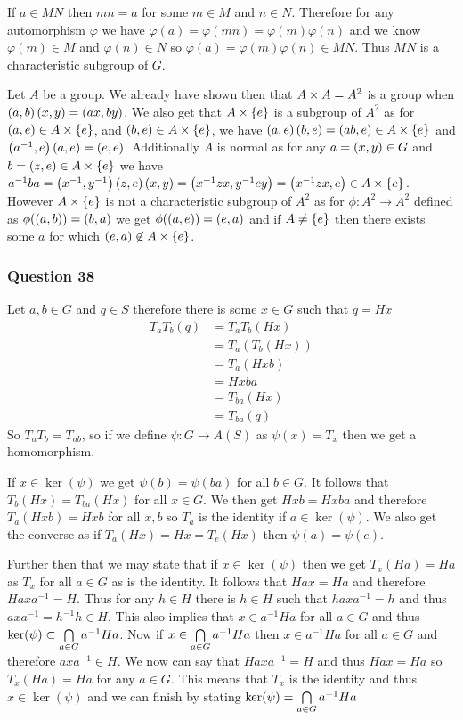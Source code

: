 \documentclass{article}
\begin{document}
 If $a \in MN$ then $mn = a$ for some $m \in M$ and $n \in N$. Therefore for any automorphism $\varphi$ we have $\varphi(a) = \varphi(mn) = \varphi(m)\varphi(n)$ and we know $\varphi(m) \in M$ and $\varphi(n)\in N$ so $\varphi(a)=\varphi(m)\varphi(n) \in MN$. Thus $MN$ is a characteristic subgroup of $G$.

 Let $A$ be a group. We already have shown then that $A\times A = A^2$ is a group when $\left( {a} , {b} \right)\left( {x} , {y} \right) = \left( {ax} , {by} \right)$. We also get that $A\times\left\{ {e} \right\}$ is a subgroup of $A^2$ as for $\left( {a} , {e} \right)\in A\times\left\{ {e} \right\}$, and $\left( {b} , {e} \right) \in A\times\left\{ {e} \right\}$, we have $\left( {a} , {e} \right)\left( {b} , {e} \right) = \left( {ab} , {e} \right)\in A\times\left\{ {e} \right\}$ and $\left( {a^{-1}} , {e} \right)\left( {a} , {e} \right) = \left( {e} , {e} \right)$. Additionally $A$ is normal as for any $a =\left( {x} , {y} \right)\in G$ and $b = \left( {z} , {e} \right)\in A\times\left\{ {e} \right\}$ we have $a^{-1}ba = \left( {x^{-1}} , {y^{-1}} \right)\left( {z} , {e} \right)\left( {x} , {y} \right) = \left( {x^{-1}zx} , {y^{-1}ey} \right) = \left( {x^{-1}zx} , {e} \right) \in A\times\left\{ {e} \right\}$. However $A\times\left\{ {e} \right\}$ is not a characteristic subgroup of $A^2$ as for $\phi:A^2\to A^2$ defined as $\phi(\left( {a} , {b} \right)) = \left( {b} , {a} \right)$ we get $\phi(\left( {a} , {e} \right)) = \left( {e} , {a} \right)$ and if $A\not=\left\{ {e} \right\}$ then there exists some $a$ for which $\left( {e} , {a} \right) \not \in A \times \left\{ {e} \right\}$.

\subsubsection{Question 38}
Let $a,b \in G $ and $q \in S$ therefore there is some $x \in G$ such that $q = Hx$
\begin{align*}
T_aT_b(q) &= T_aT_b(Hx) \\
&= T_a(T_b(Hx))\\
&= T_a(Hxb) \\
&= Hxba \\
&= T_{ba}(Hx) \\
&= T_{ba}(q)
\end{align*}
So $T_aT_b = T_{ab}$, so if we define $\psi: G\to A(S)$ as $\psi(x) = T_x$ then we get a homomorphism.

 If $x \in \ker(\psi)$ we get $\psi(b) = \psi(ba)$ for all $b\in G$. It follows that $T_b(Hx)=T_{ba}(Hx)$ for all $x\in G$. We then get $Hxb = Hxba$ and therefore $T_{a}(Hxb) = Hxb$ for all $x,b$ so $T_a$ is the identity if $a \in \ker(\psi)$. We also get the converse as if $T_a(Hx) = Hx = T_e(Hx)$ then $\psi(a) = \psi(e)$.

Further then that we may state that if $x \in \ker(\psi)$ then we get $T_x(Ha) = Ha$ as $T_x$ for all $a\in G$ as is the identity. It follows that $Hax = Ha$ and therefore $Haxa^{-1} = H$. Thus for any $h \in H$ there is $\bar h \in H$ such that $haxa^{-1} = \bar h$ and thus $axa^{-1}=h^{-1}\bar h \in H$. This also implies that $x \in a^{-1}Ha$ for all $a \in G$ and thus $\ker(\psi) \subset \bigcap\limits_{a\in G}^{}  {a^{-1}Ha} $. Now if $x \in \bigcap\limits_{a \in G}^{}  {a^{-1}Ha} $ then $x \in a^{-1}Ha$ for all $a \in G$ and therefore $axa^{-1} \in H$. We now can say that $Haxa^{-1} = H$ and thus $Hax = Ha$ so $T_x(Ha) = Ha$ for any $ a\in G$. This means that $T_x$ is the identity and thus $x \in \ker(\psi)$ and we can finish by stating $\ker(\psi) = \bigcap\limits_{a \in G}^{}  {a^{-1}Ha} $
\end{document}
